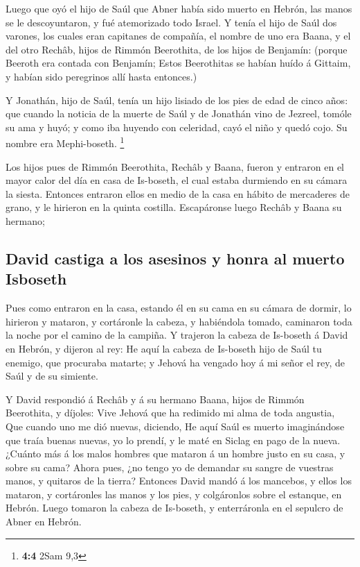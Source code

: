  Luego que oyó el hijo de Saúl que Abner había sido muerto
en Hebrón, las manos se le descoyuntaron, y fué atemorizado todo Israel.
 Y tenía el hijo de Saúl dos varones, los cuales eran
capitanes de compañía, el nombre de uno era Baana, y el del otro Rechâb,
hijos de Rimmón Beerothita, de los hijos de Benjamín: (porque Beeroth
era contada con Benjamín;  Estos Beerothitas se habían huído
á Gittaim, y habían sido peregrinos allí hasta entonces.)

 Y Jonathán, hijo de Saúl, tenía un hijo lisiado de los pies
de edad de cinco años: que cuando la noticia de la muerte de Saúl y de
Jonathán vino de Jezreel, tomóle su ama y huyó; y como iba huyendo con
celeridad, cayó el niño y quedó cojo. Su nombre era Mephi-boseth.
\footnote{\textbf{4:4} 2Sam 9,3}

 Los hijos pues de Rimmón Beerothita, Rechâb y Baana, fueron
y entraron en el mayor calor del día en casa de Is-boseth, el cual
estaba durmiendo en su cámara la siesta.  Entonces entraron
ellos en medio de la casa en hábito de mercaderes de grano, y le
hirieron en la quinta costilla. Escapáronse luego Rechâb y Baana su
hermano;

\hypertarget{david-castiga-a-los-asesinos-y-honra-al-muerto-isboseth}{%
\subsection{David castiga a los asesinos y honra al muerto
Isboseth}\label{david-castiga-a-los-asesinos-y-honra-al-muerto-isboseth}}

 Pues como entraron en la casa, estando él en su cama en su
cámara de dormir, lo hirieron y mataron, y cortáronle la cabeza, y
habiéndola tomado, caminaron toda la noche por el camino de la campiña.
 Y trajeron la cabeza de Is-boseth á David en Hebrón, y
dijeron al rey: He aquí la cabeza de Is-boseth hijo de Saúl tu enemigo,
que procuraba matarte; y Jehová ha vengado hoy á mi señor el rey, de
Saúl y de su simiente.

 Y David respondió á Rechâb y á su hermano Baana, hijos de
Rimmón Beerothita, y díjoles: Vive Jehová que ha redimido mi alma de
toda angustia,  Que cuando uno me dió nuevas, diciendo, He
aquí Saúl es muerto imaginándose que traía buenas nuevas, yo lo prendí,
y le maté en Siclag en pago de la nueva.  ¿Cuánto más á los
malos hombres que mataron á un hombre justo en su casa, y sobre su cama?
Ahora pues, ¿no tengo yo de demandar su sangre de vuestras manos, y
quitaros de la tierra?  Entonces David mandó á los
mancebos, y ellos los mataron, y cortáronles las manos y los pies, y
colgáronlos sobre el estanque, en Hebrón. Luego tomaron la cabeza de
Is-boseth, y enterráronla en el sepulcro de Abner en Hebrón.

